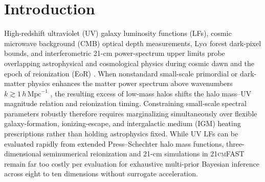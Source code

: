 \documentclass[aps,prd,reprint,superscriptaddress,nofootinbib,amsmath,amssymb,floatfix,longbibliography]{revtex4-2}
\begin{document}
\begin{abstract}
$0.973$ to $0.052$, removing the frozen-base $t_\star$ PS+LF posterior bias ($0.6326 \to 0.4942$, $0.524\sigma \to 0.017\sigma$ around truth $0.500$). Extending this local surrogate to anisotropic Mat\'ern-5/2 automatic-relevance-determination Gaussian-process (ARD-GP) patches across four lightcone/coeval benchmarks suppresses held-out $L_2\ p_{90}$ residuals to $0.0278\text{--}0.0656$ (from $0.6699\text{--}3.9249$), enabling three-way 8D hybrid Stretch+GMM MCMC chains ($230{,}400$ post-burn samples each) at $\mathrm{PL}\,(10,0.968)$ ($\max\widehat{R}=1.0071$, $|\mathrm{med\_z}|\le 0.383$), $\mathrm{BT}\,(10,2.5)$ ($\max\widehat{R}=1.0105$), and $\mathrm{BT}\,(3,2.0)$ ($\max\widehat{R}=1.0049$).
\end{abstract}

\maketitle

\section{Introduction}\label{sec:intro}

High-redshift ultraviolet (UV) galaxy luminosity functions (LFs), cosmic microwave background (CMB) optical depth measurements, Ly$\alpha$ forest dark-pixel bounds, and interferometric 21-cm power-spectrum upper limits probe overlapping astrophysical and cosmological physics during cosmic dawn and the epoch of reionization (EoR) \cite{Mesinger2011,Park2019,Planck2018,McGreer2015,Donnan2024,HERA2023}. When nonstandard small-scale primordial or dark-matter physics enhances the matter power spectrum above wavenumbers $k \gtrsim 1\,h\,\mathrm{Mpc}^{-1}$ \cite{Parashari23JWSTPPS,Hira24bluetilt,MunozDvorkin2020}, the resulting excess of low-mass halos shifts the halo mass--UV magnitude relation and reionization timing. Constraining small-scale spectral parameters robustly therefore requires marginalizing simultaneously over flexible galaxy-formation, ionizing-escape, and intergalactic medium (IGM) heating prescriptions rather than holding astrophysics fixed. While UV LFs can be evaluated rapidly from extended Press--Schechter halo mass functions, three-dimensional seminumerical reionization and 21-cm simulations in \textsc{21cmFAST} \cite{Mesinger2011,Murray2020} remain far too costly per evaluation for exhaustive multi-prior Bayesian inference across eight to ten dimensions without surrogate acceleration.
\end{document}
